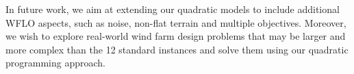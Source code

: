 \documentclass[preprint,12pt]{elsarticle}
\begin{document}
In future work, we aim at extending our quadratic models to include additional 
WFLO aspects, such as noise, non-flat terrain and multiple objectives. 
Moreover, we wish to explore real-world wind farm design problems 
that may be larger and more complex than the 12 standard instances 
and solve them 
using our quadratic programming approach. 


%

\end{document}
